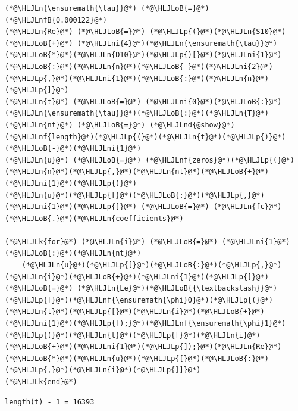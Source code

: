 \documentclass[12pt,a4paper]{article}
\newcommand{\HLJLk}[1]{\textcolor[RGB]{148,91,176}{\textbf{#1}}}
\newcommand{\HLJLn}[1]{#1}
\newcommand{\HLJLnd}[1]{\textcolor[RGB]{214,102,97}{#1}}
\newcommand{\HLJLnf}[1]{\textcolor[RGB]{66,102,213}{#1}}
\newcommand{\HLJLnfB}[1]{\textcolor[RGB]{59,151,46}{#1}}
\newcommand{\HLJLni}[1]{\textcolor[RGB]{59,151,46}{#1}}
\newcommand{\HLJLoB}[1]{\textcolor[RGB]{102,102,102}{\textbf{#1}}}
\newcommand{\HLJLp}[1]{#1}
\begin{document}
\begin{lstlisting}
(*@\HLJLn{\ensuremath{\tau}}@*) (*@\HLJLoB{=}@*) (*@\HLJLnfB{0.000122}@*) 
(*@\HLJLn{Re}@*) (*@\HLJLoB{=}@*) (*@\HLJLp{(}@*)(*@\HLJLn{S10}@*) (*@\HLJLoB{+}@*) (*@\HLJLni{4}@*)(*@\HLJLn{\ensuremath{\tau}}@*)(*@\HLJLoB{*}@*)(*@\HLJLn{D10}@*)(*@\HLJLp{)[}@*)(*@\HLJLni{1}@*)(*@\HLJLoB{:}@*)(*@\HLJLn{n}@*)(*@\HLJLoB{-}@*)(*@\HLJLni{2}@*)(*@\HLJLp{,}@*)(*@\HLJLni{1}@*)(*@\HLJLoB{:}@*)(*@\HLJLn{n}@*)(*@\HLJLp{]}@*)
(*@\HLJLn{t}@*) (*@\HLJLoB{=}@*) (*@\HLJLni{0}@*)(*@\HLJLoB{:}@*)(*@\HLJLn{\ensuremath{\tau}}@*)(*@\HLJLoB{:}@*)(*@\HLJLn{T}@*)
(*@\HLJLn{nt}@*) (*@\HLJLoB{=}@*) (*@\HLJLnd{@show}@*) (*@\HLJLnf{length}@*)(*@\HLJLp{(}@*)(*@\HLJLn{t}@*)(*@\HLJLp{)}@*)(*@\HLJLoB{-}@*)(*@\HLJLni{1}@*)
(*@\HLJLn{u}@*) (*@\HLJLoB{=}@*) (*@\HLJLnf{zeros}@*)(*@\HLJLp{(}@*)(*@\HLJLn{n}@*)(*@\HLJLp{,}@*)(*@\HLJLn{nt}@*)(*@\HLJLoB{+}@*)(*@\HLJLni{1}@*)(*@\HLJLp{)}@*)
(*@\HLJLn{u}@*)(*@\HLJLp{[}@*)(*@\HLJLoB{:}@*)(*@\HLJLp{,}@*)(*@\HLJLni{1}@*)(*@\HLJLp{]}@*) (*@\HLJLoB{=}@*) (*@\HLJLn{fc}@*)(*@\HLJLoB{.}@*)(*@\HLJLn{coefficients}@*)

(*@\HLJLk{for}@*) (*@\HLJLn{i}@*) (*@\HLJLoB{=}@*) (*@\HLJLni{1}@*)(*@\HLJLoB{:}@*)(*@\HLJLn{nt}@*)
    (*@\HLJLn{u}@*)(*@\HLJLp{[}@*)(*@\HLJLoB{:}@*)(*@\HLJLp{,}@*)(*@\HLJLn{i}@*)(*@\HLJLoB{+}@*)(*@\HLJLni{1}@*)(*@\HLJLp{]}@*) (*@\HLJLoB{=}@*) (*@\HLJLn{Le}@*)(*@\HLJLoB{{\textbackslash}}@*)(*@\HLJLp{[}@*)(*@\HLJLnf{\ensuremath{\phi}0}@*)(*@\HLJLp{(}@*)(*@\HLJLn{t}@*)(*@\HLJLp{[}@*)(*@\HLJLn{i}@*)(*@\HLJLoB{+}@*)(*@\HLJLni{1}@*)(*@\HLJLp{]);}@*)(*@\HLJLnf{\ensuremath{\phi}1}@*)(*@\HLJLp{(}@*)(*@\HLJLn{t}@*)(*@\HLJLp{[}@*)(*@\HLJLn{i}@*)(*@\HLJLoB{+}@*)(*@\HLJLni{1}@*)(*@\HLJLp{]);}@*)(*@\HLJLn{Re}@*)(*@\HLJLoB{*}@*)(*@\HLJLn{u}@*)(*@\HLJLp{[}@*)(*@\HLJLoB{:}@*)(*@\HLJLp{,}@*)(*@\HLJLn{i}@*)(*@\HLJLp{]]}@*)
(*@\HLJLk{end}@*)
\end{lstlisting}

\begin{lstlisting}
length(t) - 1 = 16393
\end{lstlisting}
\end{document}
